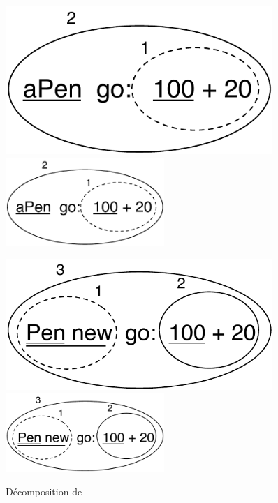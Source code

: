 \documentclass[a4paper,10pt,twoside]{book}
\begin{document}
\begin{figure}[htb]
\begin{minipage}{0.48\textwidth}
	\ifluluelse
		{\centerline{\includegraphics[width=0.9\textwidth]{uKeyBin}}}
		{\centerline{\includegraphics[width=6cm]{uKeyBin}}}
	\caption{Les messages unaires sont envoy\'es en premier, ainsi  est d'abord envoy\'e. Ceci retourne un objet de couleur qui est pass\'e en argument du message .\label{fig:uKeyBin}}
\end{minipage}
\hfill
\begin{minipage}{0.48\textwidth}
	\begin{center}
	\ifluluelse
		{\includegraphics[width=0.9\textwidth]{uunKeyBin}}
		{\includegraphics[width=6cm]{uunKeyBin}}
\caption{D\'ecomposition de }\label{fig:unKeyBin}
\end{center}
\end{minipage}
\end{figure}
\end{document}
